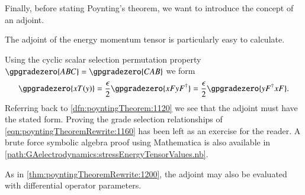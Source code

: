 Finally, before stating Poynting's theorem, we want to introduce the concept of an adjoint.

The adjoint of the energy momentum tensor is particularly easy to calculate.

Using
the cyclic scalar selection permutation property \(\gpgradezero{ABC} = \gpgradezero{CAB}\) we form
\begin{dmath}\label{eqn:poyntingTheoremRewrite:1160}
\gpgradezero{ x T(y) }
=
\frac{\epsilon}{2} \gpgradezero{ x F y F^\dagger }
=
\frac{\epsilon}{2} \gpgradezero{ y F^\dagger x F }.
\end{dmath}
Referring back to \cref{dfn:poyntingTheorem:1120} we see that the adjoint must have the stated form.
Proving the grade selection relationships of \cref{eqn:poyntingTheoremRewrite:1160} has been left as
an exercise for the reader.  A brute force symbolic algebra proof using Mathematica is also available in \cref{path:GAelectrodynamics:stressEnergyTensorValues.nb}.

As in \cref{thm:poyntingTheoremRewrite:1200},
the adjoint may also be evaluated with differential operator parameters.

